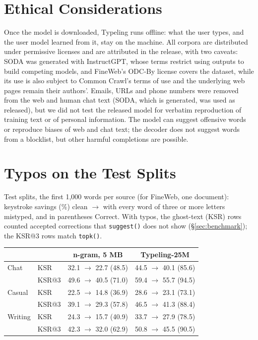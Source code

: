 \documentclass[11pt]{article}
\begin{document}
\section*{Ethical Considerations}

Once the model is downloaded, Typeling runs offline: what the user types, and the user model learned from it, stay
on the machine. All corpora are distributed under permissive licenses and are attributed in the release, with two
caveats: SODA was generated with InstructGPT, whose terms restrict using outputs to build competing models, and
FineWeb's ODC-By license covers the dataset, while its use is also subject to Common Crawl's terms of use and the
underlying web pages remain their authors'. Emails, URLs and phone numbers were removed from the web and human chat
text (SODA, which is generated, was used as released), but
we did not test the released model for verbatim reproduction of training text or of personal information. The
model can suggest offensive words or reproduce biases of web and chat text; the decoder does not suggest words from
a blocklist, but other harmful completions are possible.



\appendix

\section{Typos on the Test Splits}
\label{app:typos}

Test splits, the first 1,000 words per source (for FineWeb, one document): keystroke savings (\%) clean $\to$ with
every word of three or more letters mistyped, and in parentheses Correct. With typos, the ghost-text (KSR) rows
counted accepted corrections that \texttt{suggest()} does not show (\S\ref{sec:benchmark}); the KSR@3 rows match
\texttt{topk()}.

\begin{center}
\footnotesize
\setlength{\tabcolsep}{3pt}
\begin{tabular}{@{}llcc@{}}
\toprule
& & n-gram, 5 MB & Typeling-25M \\
\midrule
Chat & KSR & 32.1 $\to$ 22.7 (48.5) & 44.5 $\to$ 40.1 (85.6) \\
& KSR@3 & 49.6 $\to$ 40.5 (71.0) & 59.4 $\to$ 55.7 (94.5) \\
Casual & KSR & 22.5 $\to$ 14.8 (36.9) & 28.6 $\to$ 23.1 (73.1) \\
& KSR@3 & 39.1 $\to$ 29.3 (57.8) & 46.5 $\to$ 41.3 (88.4) \\
Writing & KSR & 24.3 $\to$ 15.7 (40.9) & 33.7 $\to$ 27.9 (78.5) \\
& KSR@3 & 42.3 $\to$ 32.0 (62.9) & 50.8 $\to$ 45.5 (90.5) \\
\bottomrule
\end{tabular}
\end{center}
\end{document}

